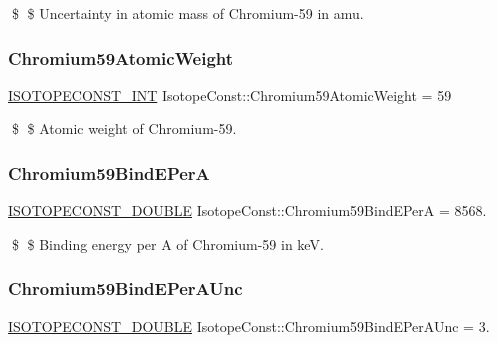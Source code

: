 \$ \$ Uncertainty in atomic mass of Chromium-\/59 in amu. \mbox{\label{group___isotope_const-_chromium-_cr59_ga4964524515334a7bbb081ba1a58cdf76}} 
\subsubsection{\texorpdfstring{Chromium59\+Atomic\+Weight}{Chromium59AtomicWeight}}
{\footnotesize\ttfamily \mbox{\hyperlink{group___isotope_const-_macros_ga5f18360b3e99483a35c32d789e62621c}{I\+S\+O\+T\+O\+P\+E\+C\+O\+N\+S\+T\+\_\+\+I\+NT}} Isotope\+Const\+::\+Chromium59\+Atomic\+Weight = 59}

\$ \$ Atomic weight of Chromium-\/59. \mbox{\label{group___isotope_const-_chromium-_cr59_ga50bcbaa0bdf8c776037b2f597e340fcb}} 
\subsubsection{\texorpdfstring{Chromium59\+Bind\+E\+PerA}{Chromium59BindEPerA}}
{\footnotesize\ttfamily \mbox{\hyperlink{group___isotope_const-_macros_ga8f45a7272ce02c0b4c65c44636ed719a}{I\+S\+O\+T\+O\+P\+E\+C\+O\+N\+S\+T\+\_\+\+D\+O\+U\+B\+LE}} Isotope\+Const\+::\+Chromium59\+Bind\+E\+PerA = 8568.}

\$ \$ Binding energy per A of Chromium-\/59 in keV. \mbox{\label{group___isotope_const-_chromium-_cr59_ga0aa5cd03c0f745c4bc1a1e158388046b}} 
\subsubsection{\texorpdfstring{Chromium59\+Bind\+E\+Per\+A\+Unc}{Chromium59BindEPerAUnc}}
{\footnotesize\ttfamily \mbox{\hyperlink{group___isotope_const-_macros_ga8f45a7272ce02c0b4c65c44636ed719a}{I\+S\+O\+T\+O\+P\+E\+C\+O\+N\+S\+T\+\_\+\+D\+O\+U\+B\+LE}} Isotope\+Const\+::\+Chromium59\+Bind\+E\+Per\+A\+Unc = 3.}

